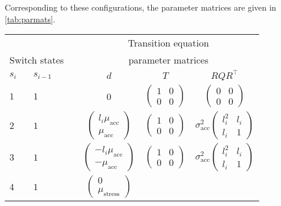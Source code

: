 \documentclass[12pt]{article}
\begin{document}
Corresponding to these configurations, the parameter
matrices are given in \autoref{tab:parmats}.
\begin{table}[h!]
\centering
\begin{tabular}[h!]{@{}llcccc@{}}
\toprule
&&&\multicolumn{3}{c}{Transition equation}\\
  \multicolumn{2}{c}{Switch states} &\phantom{a}& \multicolumn{3}{c}{parameter
                                      matrices}\\
  \cmidrule{1-2} \cmidrule{4-6}
  $s_i$ & $s_{i-1}$ && $d$ & $T$ & $R Q R^\top$ \\
  \midrule
  $1$ &  $1$ && 0 & $\begin{pmatrix}1&0\\0&0\end{pmatrix}$ 
                 & $\begin{pmatrix}0&0\\0&0\end{pmatrix}$\\
  $2$ & $1$ && $\begin{pmatrix} l_i\mu_{\textrm{acc}}\\ \mu_{\textrm{acc}}\end{pmatrix}$ 
                                    & $\begin{pmatrix} 1 & 0 \\ 0 &
                                      0 \end{pmatrix}$ 
        & $\sigma_{\textrm{acc}}^2\begin{pmatrix} l_i^2 & l_i\\ l_i & 1 \end{pmatrix}$\\
  $3$ & $1$ && $\begin{pmatrix} -l_i\mu_{\textrm{acc}}\\ -\mu_{\textrm{acc}}\end{pmatrix}$ 
                                    & $\begin{pmatrix} 1 & 0 \\ 0 &
                                      0 \end{pmatrix}$ 
        & $\sigma_{\textrm{acc}}^2\begin{pmatrix} l_i^2 & l_i\\ l_i & 1 \end{pmatrix}$\\
  $4$ & $1$ && $\begin{pmatrix}0\\\mu_{\textrm{stress}}\end{pmatrix}$ 

\end{tabular}
\end{table}
\end{document}
